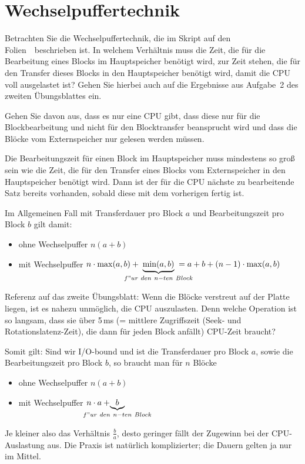 \section{Wechselpuffertechnik}
Betrachten Sie die Wechselpuffertechnik, die im Skript auf den Folien~\Wechselpuffertechnik~beschrieben ist. In welchem Verhältnis muss die Zeit, die für die Bearbeitung eines Blocks im Hauptspeicher benötigt wird, zur Zeit stehen, die für den Transfer dieses Blocks in den Hauptspeicher benötigt wird, damit die CPU voll ausgelastet ist? Gehen Sie hierbei auch auf die Ergebnisse aus Aufgabe~2 des zweiten Übungsblattes ein.

Gehen Sie davon aus, dass es nur eine CPU gibt, dass diese nur für die Blockbearbeitung und nicht für den Blocktransfer beansprucht wird und dass die Blöcke vom Externspeicher nur gelesen werden müssen.

\begin{solution}
Die Bearbeitungszeit für einen Block im Hauptspeicher muss mindestens so groß sein wie die Zeit, die für den Transfer eines Blocks vom Externspeicher in den Hauptspeicher benötigt wird.
Dann ist der für die CPU nächste zu bearbeitende Satz bereits vorhanden, sobald diese mit dem vorherigen fertig ist.

Im Allgemeinen Fall mit Transferdauer pro Block $a$ und Bearbeitungszeit pro Block $b$ gilt damit:
\begin{itemize}
	\item ohne Wechselpuffer $n(a+b)$
	\item mit Wechselpuffer $n \cdot \max(a, b)+\hspace{-20pt}\underbrace{\min(a, b)}_{f"ur~den~n-ten~Block}\hspace{-20pt} = a + b + (n-1) \cdot \max(a,b)$
\end{itemize}

Referenz auf das zweite Übungsblatt:
Wenn die Blöcke verstreut auf der Platte liegen, ist es nahezu unmöglich, die CPU auszulasten. Denn welche Operation ist so langsam, dass sie über 5\,ms (= mittlere Zugriffszeit (Seek- und Rotationslatenz-Zeit), die dann für jeden Block anfällt) CPU-Zeit braucht?

Somit gilt: Sind wir I/O-bound und ist die Transferdauer pro Block $a$, sowie die Bearbeitungszeit pro Block $b$, so braucht man für $n$ Blöcke
\begin{itemize}
	\item ohne Wechselpuffer $n(a+b)$
	\item mit Wechselpuffer $n \cdot a+\hspace{-35pt}\underbrace{b}_{f"ur~den~n-ten~Block}$
\end{itemize}

Je kleiner also das Verhältnis $\frac{b}{a}$, desto geringer fällt der Zugewinn bei der CPU-Auslastung aus. Die Praxis ist natürlich komplizierter; die Dauern gelten ja nur im Mittel.





\end{solution}

